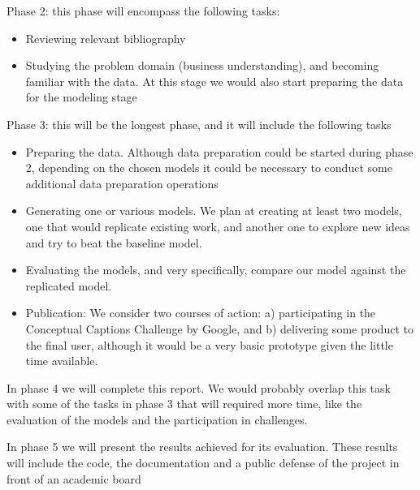 Phase 2: this phase will encompass the following tasks:
\begin{itemize}
\item Reviewing relevant bibliography
\item Studying the problem domain (business understanding), and becoming familiar with the data. At this stage we would also start preparing the data for the modeling stage
\end{itemize}

Phase 3: this will be the longest phase, and it will include the following tasks  
\begin{itemize}
\item Preparing the data. Although data preparation could be started during phase 2, depending on the chosen models it could be necessary to conduct some additional data preparation operations
\item Generating one or various models. We plan at creating at least two models, one that would replicate existing work, and another one to explore new ideas and try to beat the baseline model.
\item Evaluating the models, and very specifically, compare our model against the replicated model.
\item Publication: We consider two courses of action: a) participating in the Conceptual Captions Challenge by Google, and b) delivering some product to the final user, although it would be a very basic prototype given the little time available.
\end{itemize}

In phase 4 we will complete this report. We would probably overlap this task with some of the tasks in phase 3 that will required more time, like the evaluation of the models and the participation in challenges.

In phase 5 we will present the results achieved for its evaluation. These results will include the code, the documentation and a public defense of the project in front of an academic board

